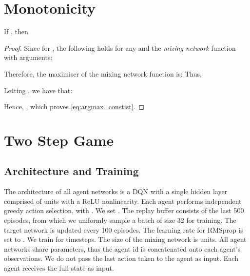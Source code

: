 \documentclass[twoside,11pt]{article}
\begin{document}
 




\newpage

\appendix

\section{Monotonicity}
\label{appendix:monotonicity}
	\label{proof:mon}
	\begin{theorem} 
		If ,  then
		
	\end{theorem}
	\begin{proof}
	Since  for , the following holds for any  and the \textit{mixing network} function  with  arguments:
	
	Therefore, 
	the maximiser of the mixing network function is: 
	Thus,
	
	Letting ,
	we have that:
	
	Hence, , 
	which proves \eqref{eq:argmax_constist}.
	\end{proof}

 \section{Two Step Game}
\label{sec:2step_arch}

\subsection{Architecture and Training}

The architecture of all agent networks is a DQN with a single hidden layer comprised of  units with a ReLU nonlinearity. Each agent performs independent  greedy action selection, with . We set . The replay buffer consists of the last 500 episodes, from which we uniformly sample a batch of size 32 for training. The target network is updated every 100 episodes. The learning rate for RMSprop is set to . We train for  timesteps. The size of the mixing network is  units. All agent networks share parameters, thus the agent id is concatenated onto each agent's observations. We do not pass the last action taken to the agent as input. Each agent receives the full state as input.
\end{document}
